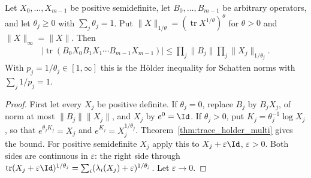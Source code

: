 \begin{theorem}
    \label{thm:trace_holder_schatten}
    \leanok
    Let $X_0,\ldots,X_{m-1}$ be positive semidefinite, let
    $B_0,\ldots,B_{m-1}$ be arbitrary operators, and let $\theta_j\ge0$
    with $\sum_j\theta_j=1$. Put $\|X\|_{1/\theta}=(\operatorname{tr}X^{1/\theta})^{\theta}$
    for $\theta>0$ and $\|X\|_{\infty}=\|X\|$. Then
    \begin{align*}
        \bigl|\operatorname{tr}(B_0X_0B_1X_1\cdots B_{m-1}X_{m-1})\bigr|
        \le\prod_j\|B_j\|\prod_j\|X_j\|_{1/\theta_j}.
    \end{align*}
    With $p_j=1/\theta_j\in[1,\infty]$ this is the Hölder inequality for
    Schatten norms with $\sum_j1/p_j=1$.
\end{theorem}
\begin{proof}\leanok
    First let every $X_j$ be positive definite. If $\theta_j=0$, replace
    $B_j$ by $B_jX_j$, of norm at most $\|B_j\|\|X_j\|$, and $X_j$ by
    $e^{0}=\Id$. If $\theta_j>0$, put $K_j=\theta_j^{-1}\log X_j$, so that
    $e^{\theta_jK_j}=X_j$ and $e^{K_j}=X_j^{1/\theta_j}$.
    Theorem~\ref{thm:trace_holder_multi} gives the bound.
    For positive semidefinite $X_j$ apply this to $X_j+\varepsilon\Id$,
    $\varepsilon>0$. Both sides are continuous in $\varepsilon$: the right
    side through $\operatorname{tr}(X_j+\varepsilon\Id)^{1/\theta_j}
    =\sum_i(\lambda_i(X_j)+\varepsilon)^{1/\theta_j}$. Let
    $\varepsilon\to0$.
\end{proof}

